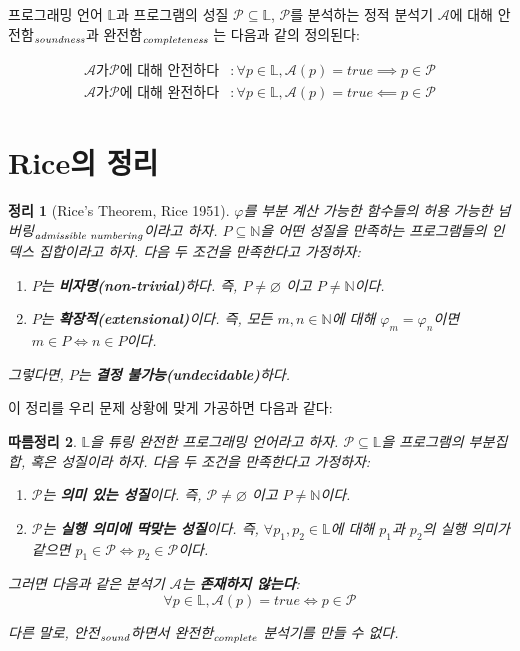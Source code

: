 \documentclass[ko]{snu-cse-bsc-thesis}
\newtheorem{theorem}{정리}[section]
\newtheorem{corollary}[theorem]{따름정리}
\newcommand{\alt}[2]{#1\textsubscript{\ensuremath{\text{\scriptsize\textit{#2}}}}}
\begin{document}
프로그래밍 언어 $\mathbb{L}$과 프로그램의 성질 $\mathscr{P} \subseteq \mathbb{L}$, $\mathscr{P}$를 분석하는 정적 분석기 $\mathcal{A}$에 대해 \alt{안전함}{soundness}과 \alt{완전함}{completeness} 는 다음과 같의 정의된다:

\begin{align*}
     \mathcal{A} \text{가} \mathscr{P}\text{에 대해 안전하다} &: \forall p \in \mathbb{L}, \mathcal{A}(p) = true \implies p \in \mathscr{P} \\
     \mathcal{A} \text{가} \mathscr{P}\text{에 대해 완전하다} &: \forall p \in \mathbb{L}, \mathcal{A}(p) = true \impliedby p \in \mathscr{P}
\end{align*}


\section{Rice의 정리}\label{sec:rices_theorem}

\begin{theorem}[Rice's Theorem, Rice 1951]
     $\varphi$를 부분 계산 가능한 함수들의 허용 가능한 \alt{넘버링}{admissible numbering}이라고 하자.  
     $P \subseteq \mathbb{N}$을 어떤 성질을 만족하는 프로그램들의 인덱스 집합이라고 하자.  
     다음 두 조건을 만족한다고 가정하자:
     \begin{enumerate}
     \item $P$는 \textbf{비자명(non-trivial)}하다. 즉, $P \neq \varnothing$ 이고 $P \neq \mathbb{N}$이다.
     \item $P$는 \textbf{확장적(extensional)}이다. 즉, 모든 $m,n \in \mathbb{N}$에 대해  
     $\varphi_m = \varphi_n$이면 $m \in P \iff n \in P$이다.
     \end{enumerate}
     그렇다면, $P$는 \textbf{결정 불가능(undecidable)}하다.
\end{theorem}

이 정리를 우리 문제 상황에 맞게 가공하면 다음과 같다:

\begin{corollary}
     $\mathbb{L}$을 튜링 완전한 프로그래밍 언어라고 하자. 
     $\mathscr{P} \subseteq \mathbb{L}$을 프로그램의 부분집합, 혹은 성질이라 하자. 
     다음 두 조건을 만족한다고 가정하자: 
     
     \begin{enumerate}
     \item $\mathscr{P}$는 \textbf{의미 있는 성질}이다. 즉, $\mathscr{P} \neq \varnothing$ 이고 $P \neq \mathbb{N}$이다.
     \item $\mathscr{P}$는 \textbf{실행 의미에 딱맞는 성질}이다. 즉, $\forall p_1, p_2 \in \mathbb{L}$에 대해  
     $p_1$과 $p_2$의 실행 의미가 같으면 $p_1 \in \mathscr{P} \iff p_2 \in \mathscr{P}$이다.
     \end{enumerate}

     그러면 다음과 같은 분석기 $\mathcal{A}$는 \textbf{존재하지 않는다}:
     $$\forall p \in \mathbb{L}, \mathcal{A}(p) = true \iff p \in \mathscr{P}$$

     다른 말로, \alt{안전}{sound}하면서 \alt{완전한}{complete} 분석기를 만들 수 없다.
\end{corollary}
\end{document}
